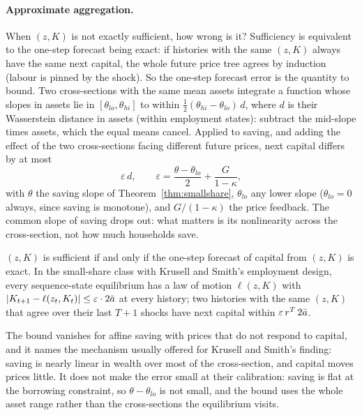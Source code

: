 \paragraph{Approximate aggregation.} When $(z,K)$ is not exactly sufficient, how wrong is it?
Sufficiency is equivalent to the one-step forecast being exact: if histories with the same $(z,K)$
always have the same next capital, the whole future price tree agrees by induction (labour is pinned
by the shock). So the one-step forecast error is the quantity to bound. Two cross-sections with the
same mean assets integrate a function whose slopes in assets lie in $[\theta_{lo},\theta_{hi}]$ to
within $\tfrac12(\theta_{hi}-\theta_{lo})\,d$, where $d$ is their Wasserstein distance in assets
(within employment states): subtract the mid-slope times assets, which the equal means cancel.
Applied to saving, and adding the effect of the two cross-sections facing different future prices,
next capital differs by at most
\[
  \varepsilon\, d,\qquad \varepsilon=\frac{\theta-\theta_{lo}}{2}+\frac{G}{1-\kappa},
\]
with $\theta$ the saving slope of Theorem~\ref{thm:smallshare}, $\theta_{lo}$ any lower slope
($\theta_{lo}=0$ always, since saving is monotone), and $G/(1-\kappa)$ the price feedback. The common
slope of saving drops out: what matters is its nonlinearity across the cross-section, not how much
households save.

\begin{theorem}\label{thm:approx}
$(z,K)$ is sufficient if and only if the one-step forecast of capital from $(z,K)$ is exact. In the
small-share class with Krusell and Smith's employment design, every sequence-state equilibrium has
a law of motion $\ell(z,K)$ with $|K_{t+1}-\ell(z_t,K_t)|\le\varepsilon\cdot 2\bar a$ at every history;
two histories with the same $(z,K)$ that agree over their last $T+1$ shocks have next capital within
$\varepsilon\, r^T\, 2\bar a$.
\end{theorem}

\noindent
The bound vanishes for affine saving with prices that do not respond to capital, and it names the
mechanism usually offered for Krusell and Smith's finding: saving is nearly linear in wealth over
most of the cross-section, and capital moves prices little. It does not make the error small at
their calibration: saving is flat at the borrowing constraint, so $\theta-\theta_{lo}$ is not small,
and the bound uses the whole asset range rather than the cross-sections the equilibrium visits.
